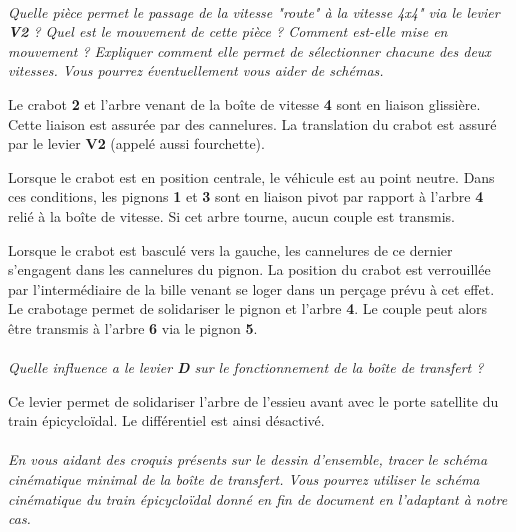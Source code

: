 \documentclass[11pt,oneside]{article}
\begin{document}
\paragraph{}
\textit{Quelle pièce permet le passage de la vitesse "route" à la vitesse 4x4" via le levier \textbf{V2} ? Quel est le mouvement de cette pièce ? Comment est-elle mise en mouvement ? Expliquer comment elle permet de sélectionner chacune des deux vitesses. Vous pourrez éventuellement vous aider de schémas.}

Le crabot \textbf{2} et l'arbre venant de la boîte de vitesse \textbf{4} sont en liaison glissière. Cette liaison est assurée par des cannelures. La translation du crabot est assuré par le levier \textbf{V2} (appelé aussi fourchette).

Lorsque le crabot est en position centrale, le véhicule est au point neutre. Dans ces conditions, les pignons \textbf{1} et \textbf{3} sont en liaison pivot par rapport à l'arbre \textbf{4} relié à la boîte de vitesse. Si cet arbre tourne, aucun couple est transmis. 

Lorsque le crabot est basculé vers la gauche, les cannelures de ce dernier s'engagent dans les cannelures du pignon. La position du crabot est verrouillée par l'intermédiaire de la bille venant se loger dans un perçage prévu à cet effet. Le crabotage permet de solidariser le pignon et l'arbre \textbf{4}. Le couple peut alors être transmis à l'arbre \textbf{6} via le pignon \textbf{5}.

\paragraph{}
\textit{Quelle influence a le levier \textbf{D} sur le fonctionnement de la boîte de transfert ?}

Ce levier permet de solidariser l'arbre de l'essieu avant avec le porte satellite du train épicycloïdal. Le différentiel est ainsi désactivé. 

\paragraph{}
\textit{En vous aidant des croquis présents sur le dessin d'ensemble, tracer le schéma cinématique minimal de la boîte de transfert. Vous pourrez utiliser le schéma cinématique du train épicycloïdal donné en fin de document en l'adaptant à notre cas.}
\end{document}
